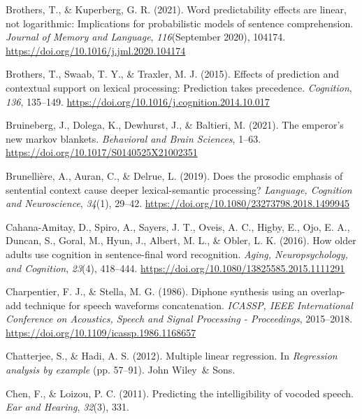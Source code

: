 \documentclass[a4paper, nobind]{templates/ociamthesis}
\newlength{\cslhangindent}
\newenvironment{CSLReferences}[2] %
 {%
  \setlength{\parindent}{0pt}
  \ifodd #1
  \let\oldpar\par
  \def\par{\hangindent=\cslhangindent\oldpar}
  \fi
  \setlength{\parskip}{1mm}
  \setlength{\baselineskip}{6mm}
 }%
 {}
\begin{document}
\begin{CSLReferences}{1}{0}
\leavevmode{}%
Brothers, T., \& Kuperberg, G. R. (2021). {Word predictability effects are linear, not logarithmic: Implications for probabilistic models of sentence comprehension}. \emph{Journal of Memory and Language}, \emph{116}(September 2020), 104174. \url{https://doi.org/10.1016/j.jml.2020.104174}

\leavevmode{}%
Brothers, T., Swaab, T. Y., \& Traxler, M. J. (2015). {Effects of prediction and contextual support on lexical processing: Prediction takes precedence}. \emph{Cognition}, \emph{136}, 135--149. \url{https://doi.org/10.1016/j.cognition.2014.10.017}

\leavevmode{}%
Bruineberg, J., Dolega, K., Dewhurst, J., \& Baltieri, M. (2021). The emperor's new markov blankets. \emph{Behavioral and Brain Sciences}, 1--63. \url{https://doi.org/10.1017/S0140525X21002351}

\leavevmode{}%
Brunellière, A., Auran, C., \& Delrue, L. (2019). {Does the prosodic emphasis of sentential context cause deeper lexical-semantic processing?} \emph{Language, Cognition and Neuroscience}, \emph{34}(1), 29--42. \url{https://doi.org/10.1080/23273798.2018.1499945}

\leavevmode{}%
Cahana-Amitay, D., Spiro, A., Sayers, J. T., Oveis, A. C., Higby, E., Ojo, E. A., Duncan, S., Goral, M., Hyun, J., Albert, M. L., \& Obler, L. K. (2016). {How older adults use cognition in sentence-final word recognition}. \emph{Aging, Neuropsychology, and Cognition}, \emph{23}(4), 418--444. \url{https://doi.org/10.1080/13825585.2015.1111291}

\leavevmode{}%
Charpentier, F. J., \& Stella, M. G. (1986). {Diphone synthesis using an overlap-add technique for speech waveforms concatenation.} \emph{ICASSP, IEEE International Conference on Acoustics, Speech and Signal Processing - Proceedings}, 2015--2018. \url{https://doi.org/10.1109/icassp.1986.1168657}

\leavevmode{}%
Chatterjee, S., \& Hadi, A. S. (2012). Multiple linear regression. In \emph{Regression analysis by example} (pp. 57--91). John Wiley~\& Sons.

\leavevmode{}%
Chen, F., \& Loizou, P. C. (2011). Predicting the intelligibility of vocoded speech. \emph{Ear and Hearing}, \emph{32}(3), 331.


\end{CSLReferences}
\end{document}
